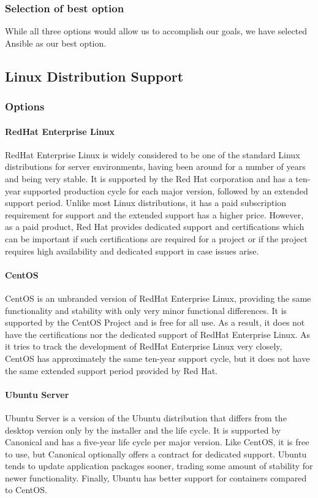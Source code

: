 \documentclass[10pt,letterpaper,onecolumn,draftclsnofoot]{IEEEtran}
\begin{document}
\subsubsection{Selection of best option}
While all three options would allow us to accomplish our goals, we have selected Ansible as our best option.

\subsection{Linux Distribution Support}
\subsubsection{Options}
\paragraph{RedHat Enterprise Linux}
RedHat Enterprise Linux is widely considered to be one of the standard Linux distributions for server environments, having been around for a number of years and being very stable. It is supported by the Red Hat corporation and has a ten-year supported production cycle for each major version, followed by an extended support period\cite{rhlife}. Unlike most Linux distributions, it has a paid subscription requirement for support and the extended support has a higher price. However, as a paid product, Red Hat provides dedicated support and certifications which can be important if such certifications are required for a project or if the project requires high availability and dedicated support in case issues arise.
\paragraph{CentOS}
CentOS is an unbranded version of RedHat Enterprise Linux, providing the same functionality and stability with only very minor functional differences. It is supported by the CentOS Project and is free for all use. As a result, it does not have the certifications nor the dedicated support of RedHat Enterprise Linux. As it tries to track the development of RedHat Enterprise Linux very closely, CentOS has approximately the same ten-year support cycle\cite{centlife}, but it does not have the same extended support period provided by Red Hat.
\paragraph{Ubuntu Server}
Ubuntu Server is a version of the Ubuntu distribution that differs from the desktop version only by the installer and the life cycle\cite{ubuntulife}. It is supported by Canonical and has a five-year life cycle per major version. Like CentOS, it is free to use, but Canonical optionally offers a contract for dedicated support. Ubuntu tends to update application packages sooner, trading some amount of stability for newer functionality. Finally, Ubuntu has better support for containers compared to CentOS.
\end{document}
